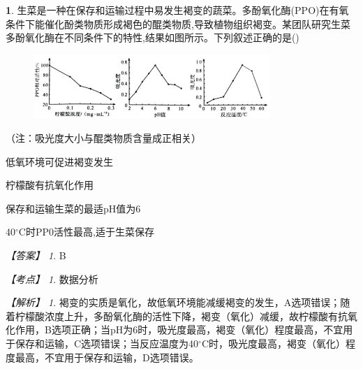 \documentclass[UTF8, 10pt, a4paper, oneside]{ctexart}
\theoremstyle{definition}
\newtheorem{exercise}{}
\theoremstyle{remark}
\newtheorem*{answer}{【答案】}
\newtheorem*{point}{【考点】}      %
\newtheorem*{explanation}{【解析】}     %
\theoremstyle{plain}
\begin{document}
\begin{exercise}
    生菜是一种在保存和运输过程中易发生褐变的蔬菜。多酚氧化酶(PPO)在有氧条件下能催化酚类物质形成褐色的醌类物质,导致植物组织褐变。某团队研究生菜多酚氧化酶在不同条件下的特性,结果如图所示。下列叙述正确的是\quad(\quad)
    \begin{figure}[h!]
        \centering
        \includegraphics[width=0.8\textwidth]{assists/6-1.jpg}
    \end{figure}
    （注：吸光度大小与醌类物质含量成正相关）\vspace{-1em}
    \begin{adjustwidth}{2em}{}
        \begin{asparaenum}[A. ]
            \item 低氧环境可促进褐变发生
            \item 柠檬酸有抗氧化作用
            \item 保存和运输生菜的最适pH值为6
            \item 40$^\circ$C时PP0活性最高,适于生菜保存
        \end{asparaenum}
    \end{adjustwidth}
    \begin{answer}
        B
    \end{answer}
    \begin{point}
        数据分析
    \end{point}
    \begin{explanation}
        褐变的实质是氧化，故低氧环境能减缓褐变的发生，A选项错误；随着柠檬酸浓度上升，多酚氧化酶的活性下降，褐变（氧化）减缓，故柠檬酸有抗氧化作用，B选项正确；当pH为6时，吸光度最高，褐变（氧化）程度最高，不宜用于保存和运输，C选项错误；当反应温度为40$^\circ$C时，吸光度最高，褐变（氧化）程度最高，不宜用于保存和运输，D选项错误。
    \end{explanation}
\end{exercise}
\end{document}
